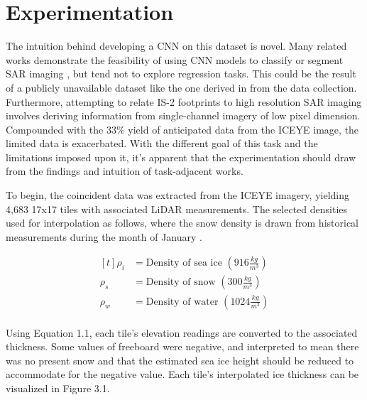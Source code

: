 \chapter{Experimentation}
\label{sec:Experimentation}

The intuition behind developing a CNN on this dataset is novel. Many related works demonstrate the feasibility of using CNN models to classify or segment SAR imaging \cite{SAR-U-Net}, but tend not to explore regression tasks. This could be the result of a publicly unavailable dataset like the one derived in from the data collection. Furthermore, attempting to relate IS-2 footprints to high resolution SAR imaging involves deriving information from single-channel imagery of low pixel dimension. Compounded with the 33$\%$ yield of anticipated data from the ICEYE image, the limited data is exacerbated. With the different goal of this task and the limitations imposed upon it, it's apparent that the experimentation should draw from the findings and intuition of task-adjacent works.

To begin, the coincident data was extracted from the ICEYE imagery, yielding 4,683 17x17 tiles with associated LiDAR measurements. The selected densities used for interpolation as follows, where the snow density is drawn from historical measurements during the month of January \cite{warren1999snow}.

\begin{figure}[h]
  \[
  \begin{aligned}[t]
    \rho_i &=  \text{Density of sea ice }(916 \frac{kg}{m^3}) \\   %
    \rho_s &=  \text{Density of snow }(300 \frac{kg}{m^3}) \\   %
    \rho_w &=  \text{Density of water }(1024 \frac{kg}{m^3}) \\   %
  \end{aligned}
\]
\end{figure}
  
Using Equation 1.1, each tile's elevation readings are converted to the associated thickness. Some values of freeboard were negative, and interpreted to mean there was no present snow and that the estimated sea ice height should be reduced to accommodate for the negative value. Each tile's interpolated ice thickness can be visualized in Figure 3.1.


